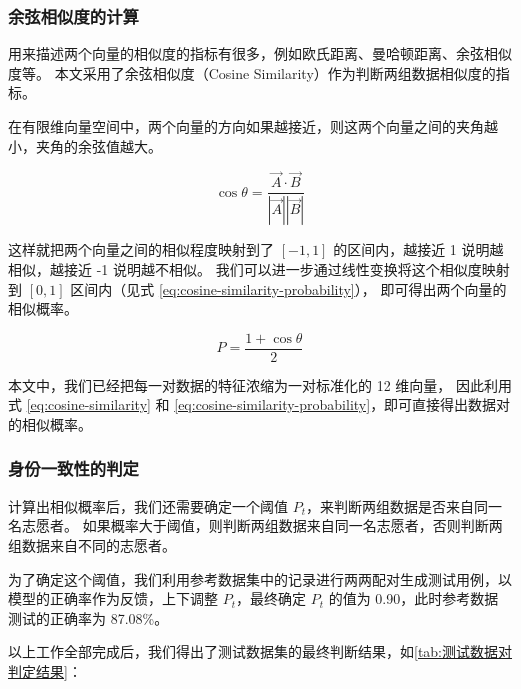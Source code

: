 \documentclass[withoutpreface]{cumcmthesis}
\begin{document}
\subsubsection{余弦相似度的计算}

用来描述两个向量的相似度的指标有很多，例如欧氏距离、曼哈顿距离、余弦相似度等。
本文采用了余弦相似度（Cosine Similarity）作为判断两组数据相似度的指标\cite{cosine-similarity}。

在有限维向量空间中，两个向量的方向如果越接近，则这两个向量之间的夹角越小，夹角的余弦值越大。

\begin{equation}
    \label{eq:cosine-similarity}
    \cos \theta = \frac{\vec{A} \cdot \vec{B}}{|\vec{A}| |\vec{B}|}
\end{equation}

这样就把两个向量之间的相似程度映射到了 $[-1, 1]$ 的区间内，越接近 1 说明越相似，越接近 -1 说明越不相似。
我们可以进一步通过线性变换将这个相似度映射到 $[0, 1]$ 区间内（见式 \cref{eq:cosine-similarity-probability}），
即可得出两个向量的相似概率。

\begin{equation}
    \label{eq:cosine-similarity-probability}
    P = \frac{1 + \cos \theta}{2}
\end{equation}

本文中，我们已经把每一对数据的特征浓缩为一对标准化的 12 维向量，
因此利用式 \cref{eq:cosine-similarity} 和 \cref{eq:cosine-similarity-probability}，即可直接得出数据对的相似概率。

\subsubsection{身份一致性的判定}

计算出相似概率后，我们还需要确定一个阈值 $P_t$，来判断两组数据是否来自同一名志愿者。
如果概率大于阈值，则判断两组数据来自同一名志愿者，否则判断两组数据来自不同的志愿者。

为了确定这个阈值，我们利用参考数据集中的记录进行两两配对生成测试用例，以模型的正确率作为反馈，上下调整 $P_t$，最终确定
$P_t$ 的值为 0.90，此时参考数据测试的正确率为 87.08\%。

以上工作全部完成后，我们得出了测试数据集的最终判断结果，如\cref{tab:测试数据对判定结果}：
\end{document}
